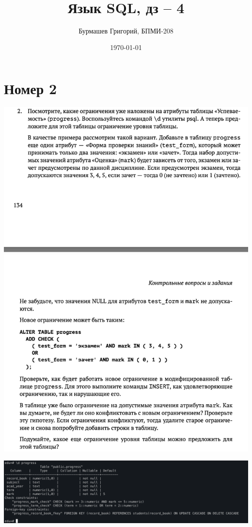 \documentclass[a4paper,12pt]{article}
\author{Бурмашев Григорий, БПМИ-208}
\title{Язык SQL, дз  -- 4}
\date{\today}
\begin{document}
\maketitle
\clearpage
\section*{Номер 2}
\begin{center}
\includegraphics[scale=0.6]{2.png}
\end{center}
\clearpage
\includegraphics[scale=0.35]{21.png}
\\
\end{document}
